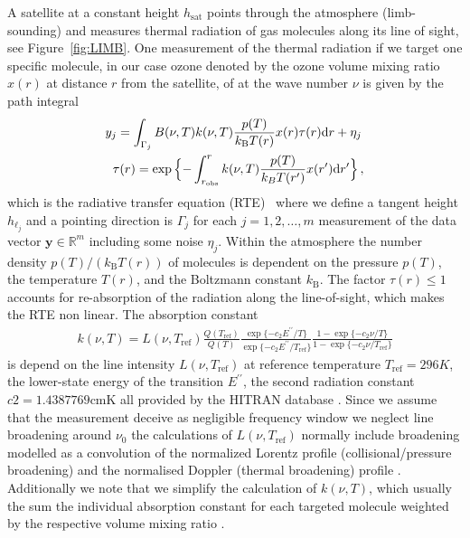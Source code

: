 A satellite at a constant height $h_{\text{sat}}$ points through the atmosphere (limb-sounding) and measures thermal radiation of gas molecules along its line of sight, see  Figure~\ref{fig:LIMB}.
One measurement of the thermal radiation if we target one specific molecule, in our case ozone denoted by the ozone volume mixing ratio $x(r)$ at distance $r$ from the satellite, of at the wave number $\nu$ is given by the path integral
\begin{align}
	\label{eq:RTE} 
	y_j =   \int_{\Gamma_j}  B(\nu,T) k(\nu, T)   \frac{p(T)}{k_{\text{B}} T(r)}  x(r)  \tau(r) \text{d}r + \eta_j \, \\
	\tau(r) = \exp{ \Bigl\{ - \int^{r}_{r_\text{obs}}  k(\nu, T)   \frac{p(T)}{k_B T(r^{\prime})}  x(r^{\prime}) \text{d}r^{\prime} \Bigr\} } \, ,\label{eq:absRTE} 
\end{align}
which is the radiative transfer equation (RTE)~\cite{mipas2000handbook} where we define a tangent height $h_{\ell_j}$ and a pointing direction is $\Gamma_j$ for each $j=1,2,\ldots,m$ measurement of the data vector $\bm{y} \in \mathbb{R}^m$ including some noise $\eta_j$.
Within the atmosphere the number density $p(T) / (k_{\text{B}} T(r))$ of molecules is dependent on the pressure $p(T)$, the temperature $T(r)$, and the Boltzmann constant $k_{\text{B}}$.
The factor $\tau(r)\leq 1$ accounts for re-absorption of the radiation along the line-of-sight, which makes the RTE non linear.
The absorption constant
\begin{align}
	k(\nu, T) = L(\nu, T_{\text{ref}}) \frac{Q(T_{\text{ref}})}{Q(T)} \frac{ \exp{\{ - c_2 E^{\prime \prime} / T\}} }{\exp{\{ - c_2 E^{\prime \prime} / T_{\text{ref}} \}}} \frac{ 1- \exp{\{ - c_2 \nu  / T \}} }{1 - \exp{\{ - c_2 \nu / T_{\text{ref}} \}}}
\end{align}
is depend on the line intensity $L(\nu, T_{\text{ref}})$ at reference temperature $T_{\text{ref}} =296K $, the lower-state energy of the transition $ E^{\prime \prime} $, the second radiation constant $c2=1.4387769\text{cmK}$ all provided by the HITRAN database \cite{gordon2022hitran2020}.
Since we assume that the measurement deceive as negligible frequency window we neglect line broadening around $\nu_0$ the calculations of $L(\nu, T_{\text{ref}})$ normally include broadening modelled as a convolution of the normalized Lorentz profile (collisional/pressure broadening) and the normalised Doppler (thermal broadening) profile \cite{}.
Additionally we note that we simplify the calculation of $k(\nu, T)$, which usually the sum the individual absorption constant for each targeted molecule weighted by the respective volume mixing ratio \cite{}.
